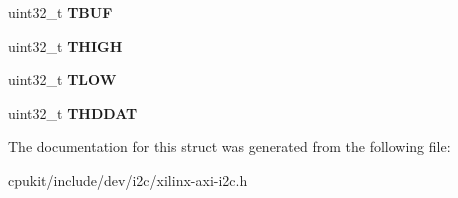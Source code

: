\begin{DoxyCompactItemize}
uint32\+\_\+t {\bfseries T\+B\+UF}
\item 
\mbox{\label{structxilinx__aix__i2c__timing_a5ef406a05d9916d4f74b6f9a94a61475}} 
uint32\+\_\+t {\bfseries T\+H\+I\+GH}
\item 
\mbox{\label{structxilinx__aix__i2c__timing_a8265787998714b73bd39156e64438ac5}} 
uint32\+\_\+t {\bfseries T\+L\+OW}
\item 
\mbox{\label{structxilinx__aix__i2c__timing_ab46c3aada9229fb0696dc428adda14cb}} 
uint32\+\_\+t {\bfseries T\+H\+D\+D\+AT}
\end{DoxyCompactItemize}


The documentation for this struct was generated from the following file\+:\begin{DoxyCompactItemize}
\item 
cpukit/include/dev/i2c/xilinx-\/axi-\/i2c.\+h\end{DoxyCompactItemize}
